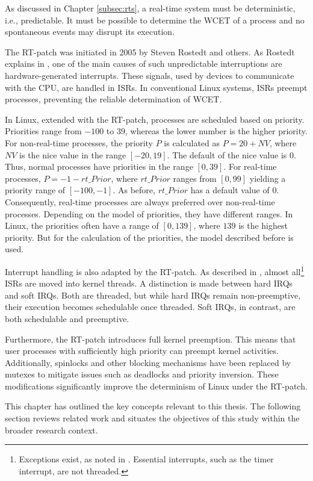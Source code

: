 As discussed in Chapter \ref{subsec:rts}, a real-time system must be deterministic, i.e., predictable.  
It must be possible to determine the \ac{WCET} of a process and no spontaneous events may disrupt its execution.  

The RT-patch was initiated in 2005 by Steven Rostedt and others.  
As Rostedt explains in \cite{rt_patch}, one of the main causes of such unpredictable interruptions are hardware-generated interrupts.  
These signals, used by devices to communicate with the \ac{CPU}, are handled in \acp{ISR}.  
In conventional Linux systems, \acp{ISR} preempt processes, preventing the reliable determination of \ac{WCET}.  

In Linux, extended with the RT-patch, processes are scheduled based on priority.  
Priorities range from $-100$ to $39$, whereas the lower number is the higher priority.  
For non-real-time processes, the priority $P$ is calculated as $P = 20 + NV$, where $NV$ is the nice value in the range $[-20, 19]$.
The default of the nice value is $0$.  
Thus, normal processes have priorities in the range $[0, 39]$.  
For real-time processes, $P = -1 - rt\_Prior$, where $rt\_Prior$ ranges from $[0, 99]$  yielding a priority range of $[-100, -1]$.  
As before, $rt\_Prior$ has a default value of $0$.
Consequently, real-time processes are always preferred over non-real-time processes.  
Depending on the model of priorities, they have different ranges.
In Linux, the priorities often have a range of $[0, 139]$, where $139$ is the highest priority.
But for the calculation of the priorities, the model described before is used.

Interrupt handling is also adapted by the RT-patch.  
As described in \cite[p. 162]{rt_patch}, almost all\footnote{Exceptions exist, as noted in \cite[p. 163]{rt_patch}. Essential interrupts, such as the timer interrupt, are not threaded.} \acp{ISR} are moved into kernel threads.  
A distinction is made between hard \acp{IRQ} and soft \acp{IRQ}.  
Both are threaded, but while hard \acp{IRQ} remain non-preemptive, their execution becomes schedulable once threaded.  
Soft \acp{IRQ}, in contrast, are both schedulable and preemptive.  

Furthermore, the RT-patch introduces full kernel preemption.  
This means that user processes with sufficiently high priority can preempt kernel activities.  
Additionally, spinlocks and other blocking mechanisms have been replaced by mutexes to mitigate issues such as deadlocks and priority inversion.  
These modifications significantly improve the determinism of Linux under the RT-patch.  

This chapter has outlined the key concepts relevant to this thesis.  
The following section reviews related work and situates the objectives of this study within the broader research context.  
